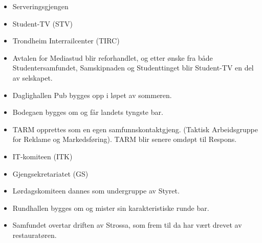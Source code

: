 
\begin{itemize}
  \item Serveringsgjengen
  \item Student-TV (STV)
\end{itemize}


\begin{itemize}
  \item Trondheim Interrailcenter (TIRC) 
\end{itemize}


\begin{itemize}
  \item Avtalen for Mediastud blir reforhandlet, og etter ønske fra både Studentersamfundet, Samskipnaden og
Studenttinget blir Student-TV en del av selskapet.
\end{itemize}


\begin{itemize}
  \item Daglighallen Pub bygges opp i løpet av sommeren.
  \item Bodegaen bygges om og får landets tyngste bar.
\end{itemize}


\begin{itemize}
  \item  TARM opprettes som en egen samfunnskontaktgjeng. (Taktisk Arbeidsgruppe for Reklame og Markedsføring). TARM blir senere omdøpt til Respons.
\end{itemize}


\begin{itemize}
  \item IT-komiteen (ITK)
  \item Gjengsekretariatet (GS)
  \item Lørdagskomiteen dannes som undergruppe av Styret.
  \item Rundhallen bygges om og mister sin karakteristiske runde bar.
\end{itemize}


\begin{itemize}
  \item Samfundet overtar driften av Strossa, som frem til da har vært drevet av restauratøren. 
\end{itemize}

